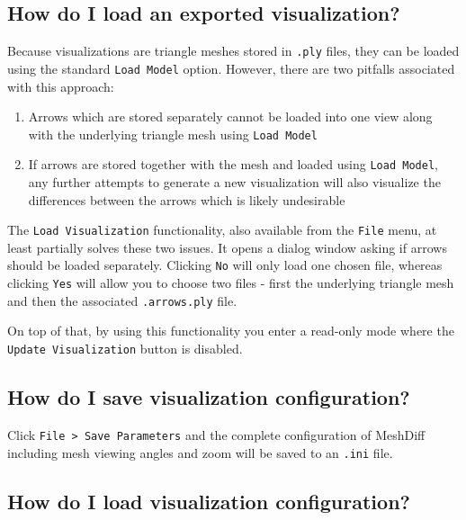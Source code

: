 \subsection{How do I load an exported visualization?}
\label{attch:user_doc-load_vis}

Because visualizations are triangle meshes stored in \verb+.ply+ files, they can be loaded using the standard \verb+Load Model+ option. However, there are two pitfalls associated with this approach:

\begin{enumerate}
\item Arrows which are stored separately cannot be loaded into one view along with the underlying triangle mesh using \verb+Load Model+
\item If arrows are stored together with the mesh and loaded using \verb+Load Model+, any further attempts to generate a new visualization will also visualize the differences between the arrows which is likely undesirable
\end{enumerate}

The \verb+Load Visualization+ functionality, also available from the \verb+File+ menu, at least partially solves these two issues. It opens a dialog window asking if arrows should be loaded separately. Clicking \verb+No+ will only load one chosen file, whereas clicking \verb+Yes+ will allow you to choose two files - first the underlying triangle mesh and then the associated \verb+.arrows.ply+ file.

On top of that, by using this functionality you enter a read-only mode where the \verb+Update Visualization+ button is disabled.

\subsection{How do I save visualization configuration?}
\label{attch:user_doc-save_config}

Click \verb+File > Save Parameters+ and the complete configuration of MeshDiff including mesh viewing angles and zoom will be saved to an \verb+.ini+ file.

\subsection{How do I load visualization configuration?}
\label{attch:user_doc-load_config}


